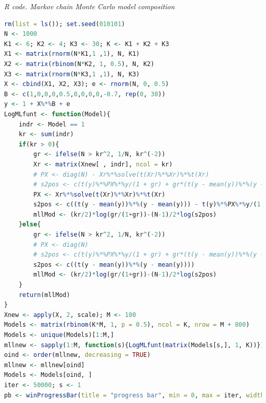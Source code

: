 \begin{enumerate}[leftmargin=*]
	\begin{tcolorbox}[enhanced,width=4.67in,center upper,
		fontupper=\large\bfseries,drop shadow southwest,sharp corners]
		\textit{R code. Markov chain Monte Carlo model composition}
		\begin{VF}
			\begin{lstlisting}[language=R]
rm(list = ls()); set.seed(010101)
N <- 1000
K1 <- 6; K2 <- 4; K3 <- 30; K <- K1 + K2 + K3
X1 <- matrix(rnorm(N*K1,1 ,1), N, K1)
X2 <- matrix(rbinom(N*K2, 1, 0.5), N, K2)
X3 <- matrix(rnorm(N*K3,1 ,1), N, K3)
X <- cbind(X1, X2, X3); e <- rnorm(N, 0, 0.5)
B <- c(1,0,0,0,0.5,0,0,0,0,-0.7, rep(0, 30))
y <- 1 + X%*%B + e
LogMLfunt <- function(Model){
	indr <- Model == 1
	kr <- sum(indr)
	if(kr > 0){
		gr <- ifelse(N > kr^2, 1/N, kr^(-2))
		Xr <- matrix(Xnew[ , indr], ncol = kr)
		# PX <- diag(N) - Xr%*%solve(t(Xr)%*%Xr)%*%t(Xr)
		# s2pos <- c(t(y)%*%PX%*%y/(1 + gr) + gr*(t(y - mean(y))%*%(y - mean(y)))/(1 + gr))
		PX <- Xr%*%solve(t(Xr)%*%Xr)%*%t(Xr)
		s2pos <- c((t(y - mean(y))%*%(y - mean(y))) - t(y)%*%PX%*%y/(1 + gr))
		mllMod <- (kr/2)*log(gr/(1+gr))-(N-1)/2*log(s2pos)
	}else{
		gr <- ifelse(N > kr^2, 1/N, kr^(-2))
		# PX <- diag(N)
		# s2pos <- c(t(y)%*%PX%*%y/(1 + gr) + gr*(t(y - mean(y))%*%(y - mean(y)))/(1 + gr))
		s2pos <- c((t(y - mean(y))%*%(y - mean(y))))
		mllMod <- (kr/2)*log(gr/(1+gr))-(N-1)/2*log(s2pos)
	}
	return(mllMod)
}
Xnew <- apply(X, 2, scale); M <- 100
Models <- matrix(rbinom(K*M, 1, p = 0.5), ncol = K, nrow = M + 800)
Models <- unique(Models)[1:M,]
mllnew <- sapply(1:M, function(s){LogMLfunt(matrix(Models[s,], 1, K))})
oind <- order(mllnew, decreasing = TRUE)
mllnew <- mllnew[oind]
Models <- Models[oind, ]
iter <- 50000; s <- 1
pb <- winProgressBar(title = "progress bar", min = 0, max = iter, width = 300)
\end{lstlisting}
		\end{VF}
	\end{tcolorbox} 


\end{enumerate}
